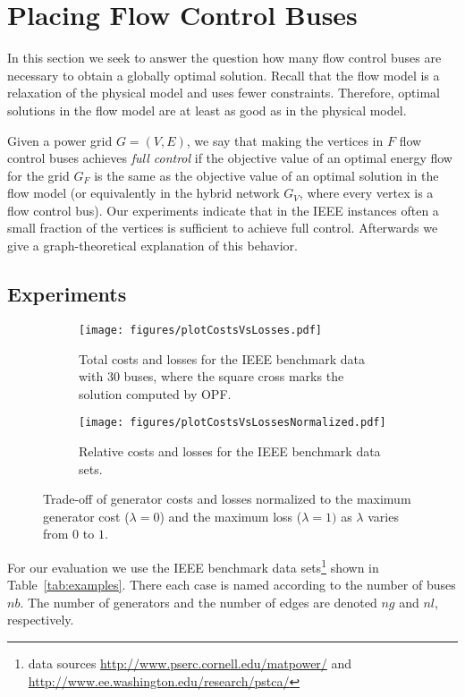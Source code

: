 \documentclass{article}[11pt,a4paper]
\newcommand{\plotscale}{0.8}
\begin{document}
\section{Placing Flow Control Buses} 
\label{sec:hybridmodel}
In this section we seek to answer the question how many flow control buses
are necessary to obtain a globally optimal solution.  
Recall that the flow model is a relaxation of the physical model and uses fewer 
constraints. Therefore, optimal solutions in the flow model are at least as good as
in the physical model.

Given a power grid $G=(V,E)$, we say that making the vertices in $F$ flow control buses achieves \emph{full control} if the objective value of an
optimal energy flow for the grid $G_F$ is the same as the objective
value of an optimal solution in the flow model (or equivalently in the
hybrid network $G_V$, where every vertex is a flow control bus).  Our experiments indicate that in the IEEE instances often a
small fraction of the vertices is sufficient to achieve full control.
Afterwards we give a graph-theoretical explanation of this behavior.
\subsection{Experiments}
\label{sub:experiments-control-units}
\begin{figure}[tb!]\centering
  \begin{subfigure}[t]{.492\textwidth}
  	\centering
    	\texttt{[image: figures/plotCostsVsLosses.pdf]}
	\caption{Total costs and losses for the IEEE benchmark data with 30 buses, where the square cross marks the solution computed by OPF.}
	\label{fig:plot-costs-losses}
\end{subfigure}
\hfill
  \begin{subfigure}[t]{.492\textwidth}
  	\centering
\texttt{[image: figures/plotCostsVsLossesNormalized.pdf]}
	\caption{Relative costs and losses for the IEEE benchmark data sets.}
	\label{fig:plot-costs-losses-normalized}
\end{subfigure}
\caption{Trade-off of generator costs and losses
          normalized to the maximum generator cost ($\lambda = 0$) and
          the maximum loss ($\lambda = 1)$ as $\lambda$ varies
          from $0$ to $1$.}
\end{figure}

For our evaluation we use the IEEE benchmark data sets\footnote{data
  sources \url{http://www.pserc.cornell.edu/matpower/} and
  \url{http://www.ee.washington.edu/research/pstca/}} shown in
Table~\ref{tab:examples}. There each case is named according to the
number of buses $nb$.  The number of generators and the number of
edges are denoted $ng$ and $nl$, respectively.
\end{document}
